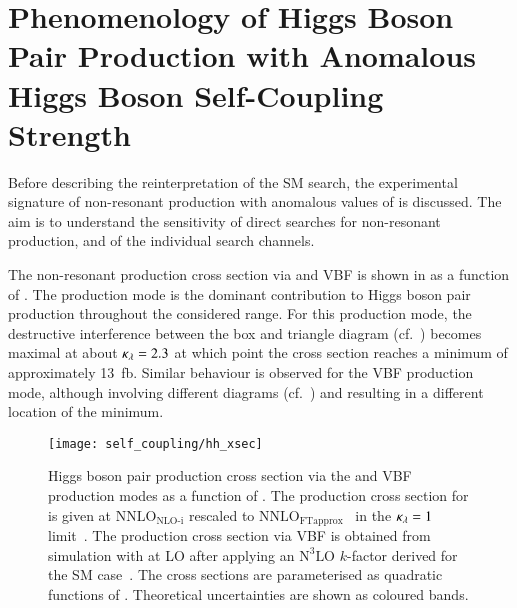 \section{Phenomenology of Higgs Boson Pair Production with Anomalous
  Higgs Boson Self-Coupling Strength}%
\label{sec:self_coupling_pheno}

Before describing the reinterpretation of the SM \HH search, the
experimental signature of non-resonant \HH production with anomalous
values of \klambda is discussed. The aim is to understand the
sensitivity of direct searches for non-resonant \HH production, and of
the individual search channels.

The non-resonant \HH production cross section via \ggF and VBF is shown in
 as a function of \klambda. The \ggF production mode is
the dominant contribution to Higgs boson pair production throughout the
considered \klambda range. For this production mode, the destructive
interference between the box and triangle diagram
(cf.~) becomes maximal at about $\kappa_{\lambda} = 2.3$ at
which point the cross section reaches a minimum of approximately
\SI{13}{\femto\barn}. Similar behaviour is observed for the VBF production mode,
although involving different diagrams (cf.\
) and resulting in a different
location of the minimum.

\begin{figure}[htbp]
  \centering

  \texttt{[image: self\_coupling/hh\_xsec]}

  \caption[Higgs boson pair production cross section via the \ggF and VBF
  production modes as a function of \klambda.]{Higgs boson pair production cross
    section via the \ggF and VBF production modes as a function of \klambda. The
    production cross section for \ggF is given at $\text{NNLO}_{\text{NLO-i}}$
    rescaled to $\text{NNLO}_{\text{FTapprox}}$~\cite{Grazzini:2018bsd} in the
    $\kappa_{\lambda} = 1$ limit~\cite{Amoroso:2020lgh,Baglio:2020wgt,LHCHWGHH}. The
    production cross section via VBF is obtained from simulation with \MGNLO at
    LO after applying an $\text{N}^3\text{LO}$ $k$-factor derived for the SM
    case~\cite{Dreyer:2018qbw,LHCHWGHH}. The cross sections are parameterised as
    quadratic functions of \klambda. Theoretical uncertainties are shown as
    coloured bands.}%
  \label{fig:hh_xsec_incl}
\end{figure}

